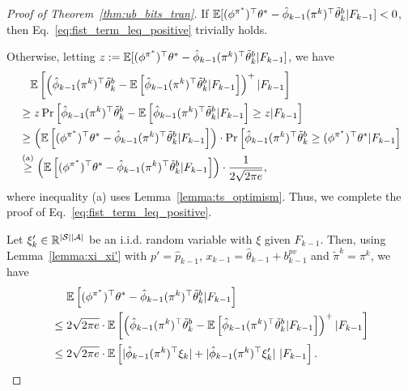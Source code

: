 \begin{proof}[Proof of Theorem~\ref{thm:ub_bits_tran}]
	If $\mathbb{E}[ (\phi^{\pi^*})^\top \theta^* - \hat{\phi}_{k-1}(\pi^k)^\top \tilde{\theta}^{b}_k | F_{k-1} ]<0$, then Eq.~\eqref{eq:fist_term_leq_positive} trivially holds. 
	
	Otherwise, letting $z:= \mathbb{E}[ (\phi^{\pi^*})^\top \theta^* - \hat{\phi}_{k-1}(\pi^k)^\top \tilde{\theta}^{b}_k | F_{k-1} ]$, we have
	\begin{align*}
		&\quad \mathbb{E}\left[  \left(  \hat{\phi}_{k-1}(\pi^k)^\top \tilde{\theta}^{b}_k  - \mathbb{E}\left[  \hat{\phi}_{k-1}(\pi^k)^\top \tilde{\theta}^{b}_k  | F_{k-1}  \right]  \right)^{+} | F_{k-1}  \right]
		\\
		&\geq z \Pr\left[   \hat{\phi}_{k-1}(\pi^k)^\top \tilde{\theta}^{b}_k  - \mathbb{E}\left[  \hat{\phi}_{k-1}(\pi^k)^\top \tilde{\theta}^{b}_k   | F_{k-1}  \right] \geq z | F_{k-1}  \right]
		\\
		&\geq \left( \mathbb{E}\left[  (\phi^{\pi^*})^\top \theta^* - \hat{\phi}_{k-1}(\pi^k)^\top \tilde{\theta}^{b}_k | F_{k-1}  \right]  \right) \cdot \Pr\left[   \hat{\phi}_{k-1}(\pi^k)^\top \tilde{\theta}^{b}_k   \geq (\phi^{\pi^*})^\top \theta^* | F_{k-1}  \right]
		\\
		&\overset{\textup{(a)}}{\geq} \left( \mathbb{E}\left[  (\phi^{\pi^*})^\top \theta^* - \hat{\phi}_{k-1}(\pi^k)^\top \tilde{\theta}^{b}_k | F_{k-1}  \right]  \right) \cdot \frac{1}{2\sqrt{2\pi e}} ,
	\end{align*}
	where inequality (a) uses Lemma~\ref{lemma:ts_optimism}. Thus, we complete the proof of Eq.~\eqref{eq:fist_term_leq_positive}.
	
	Let $\xi'_k \in \mathbb{R}^{|\mathcal{S}||\mathcal{A}|}$ be an i.i.d. random variable with $\xi$ given $F_{k-1}$.
	Then, using Lemma~\ref{lemma:xi_xi'} with $p'=\hat{p}_{k-1}$, $x_{k-1}=\hat{\theta}_{k-1}+b_{k-1}^{pv}$ and $\tilde{\pi}^k=\pi^k$, we have
	\begin{align*}
		&\quad\ \mathbb{E}\left[  (\phi^{\pi^*})^\top \theta^* - \hat{\phi}_{k-1}(\pi^k)^\top \tilde{\theta}^{b}_k | F_{k-1}  \right] 
		\\
		&\leq 2\sqrt{2\pi e} \cdot \mathbb{E}\left[  \left(  \hat{\phi}_{k-1}(\pi^k)^\top \tilde{\theta}^{b}_k  - \mathbb{E}\left[  \hat{\phi}_{k-1}(\pi^k)^\top \tilde{\theta}^{b}_k  | F_{k-1}  \right]  \right)^{+} | F_{k-1}  \right] 
		\\
		&\leq 2\sqrt{2\pi e} \cdot \mathbb{E}\left[  | \hat{\phi}_{k-1}(\pi^k)^\top \xi_k | + | \hat{\phi}_{k-1}(\pi^k)^\top \xi'_k| \ | F_{k-1}  \right] .
	\end{align*}
	

\end{proof}
